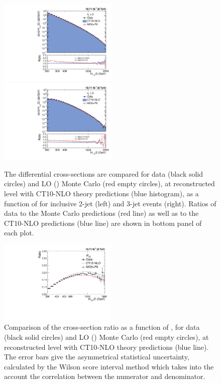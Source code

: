 \begin{figure}[!htbp]
 \begin{center}
 \hspace*{-5mm}\includegraphics[width=0.51\textwidth]{Plots_HT_2_150/Comparison_all_2_HT_2_150.pdf}%
 ~~\includegraphics[width=0.51\textwidth]{Plots_HT_2_150/Comparison_all_3_HT_2_150.pdf}
 \caption[]{The differential cross-sections are compared for data (black solid circles) and LO \MadGraphFn\plusn \PYTHIAS (\MGP) Monte Carlo (red empty circles), at reconstructed level with CT10-NLO theory predictions (blue histogram), as a function of \httwo for inclusive 2-jet (left) and 3-jet events (right). Ratios of data to the Monte Carlo predictions (red line) as well as to the CT10-NLO predictions (blue line) are shown in bottom panel of each plot.}
 \label{fig:comp_all}
 \end{center}
\end{figure}

\begin{figure}[!h] 
 \begin{center}
 \hspace*{-5mm}\includegraphics[width=0.5\textwidth]{Plots_HT_2_150/Ratio_32_all_HT_2_150.pdf}
 \caption[]{Comparison of the cross-section ratio \ratio as a function of \httwons, for data (black solid circles) and LO \MadGraphFn\plusn \PYTHIAS (\MGP) Monte Carlo (red empty circles), at reconstructed level with CT10-NLO theory predictions (blue line). The error bars give the asymmetrical statistical uncertainty, calculated by the Wilson score interval method which takes into the account the correlation between the numerator and denominator.}
 \label{fig:ratio_32}
 \end{center}
\end{figure}

